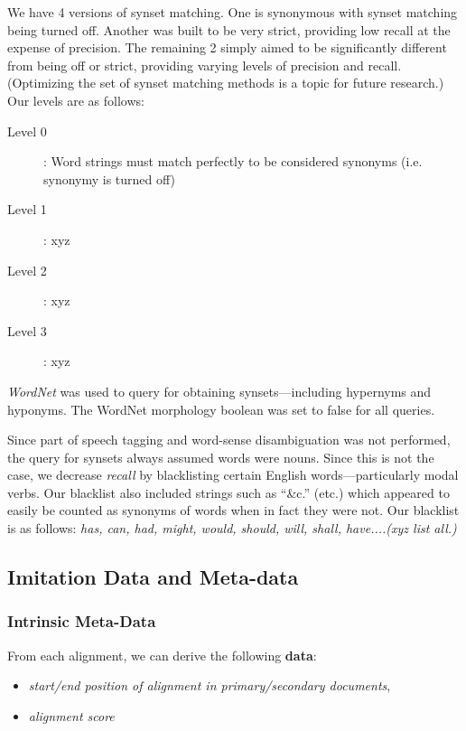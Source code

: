 We have 4 versions of synset matching. One is synonymous with synset matching being turned off. Another was built to be very strict, providing low recall at the expense of precision. The remaining 2 simply aimed to be significantly different from being off or strict, providing varying levels of precision and recall. (Optimizing the set of synset matching methods is a topic for future research.) Our levels are as follows:

\begin{description}
	\item [Level 0]: Word strings must match perfectly to be considered synonyms (i.e. synonymy is turned off)
	\item [Level 1]: xyz
	\item [Level 2]: xyz
	\item [Level 3]: xyz
\end{description}


\textit{WordNet} \cite{wordnet_1998} was used to query for obtaining synsets---including hypernyms and hyponyms. The WordNet morphology boolean was set to false for all queries. 

Since part of speech tagging and word-sense disambiguation was not performed, the query for synsets always assumed words were nouns. Since this is not the case, we decrease \textit{recall} by blacklisting certain English words---particularly modal verbs. Our blacklist also included strings such as ``\&c.'' (etc.) which appeared to easily be counted as synonyms of words when in fact they were not. Our blacklist is as follows: \textit{has, can, had, might, would, should, will, shall, have....(xyz list all.)}


\subsection{Imitation Data and Meta-data}

\subsubsection{Intrinsic Meta-Data}
From each alignment, we can derive the following \textbf{data}:
	\begin{itemize}
		\item \textit{start/end position of alignment in primary/secondary documents},
		\item \textit{alignment score}
	\end{itemize}

